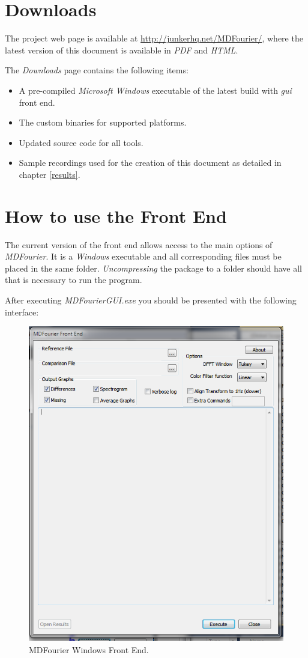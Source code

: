 \documentclass[10pt,a4paper]{report}
\newcommand{\ac}[1]{\textit{\acrshort{#1}}}
\begin{document}
\begin{appendices}
	
\chapter{Downloads}
\label{downloads}

The project web page is available at \url{http://junkerhq.net/MDFourier/}, where the latest version of this document is available in \textit{PDF} and \textit{HTML}.

The \textit{Downloads} page contains the following items:
\begin{itemize}
	\item A pre-compiled \textit{Microsoft Windows} executable of the latest build with \ac{gui} front end.
	\item The custom binaries for supported platforms.
	\item Updated source code for all tools.
	\item Sample recordings used for the creation of this document as detailed in chapter \ref{results}.
\end{itemize}
	
\chapter{How to use the Front End}
\label{usinggui}
The current version of the front end allows access to the main options of \textit{MDFourier}. It is a \textit{Windows} executable and all corresponding files must be placed in the same folder. \textit{Uncompressing} the package to a folder should have all that is necessary to run the program.

After executing \textit{MDFourierGUI.exe} you should be presented with the following interface:

\begin{figure}[H]
	\centering
	\includegraphics[width=0.6\linewidth]{images/GUI/GUI1.png}
	\caption[Front End]{MDFourier Windows Front End.}
	\label{fig:gui1}
\end{figure}


\end{appendices}
\end{document}
